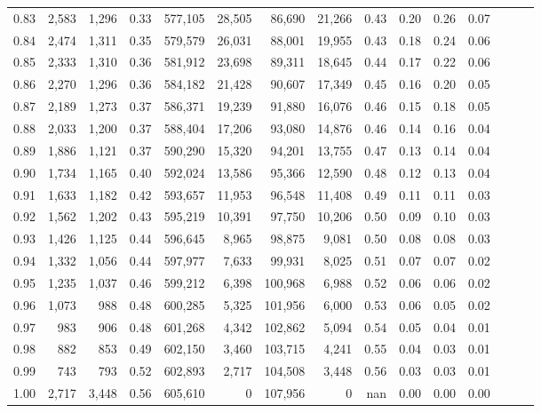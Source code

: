 \begin{tabular}{rrrrrrrrrrrrrrr}
0.83 &   2,583 &  1,296 &  0.33 &  577,105 &   28,505 &   86,690 &   21,266 &  0.43 &  0.20 &  0.26 &      0.07 \\
0.84 &   2,474 &  1,311 &  0.35 &  579,579 &   26,031 &   88,001 &   19,955 &  0.43 &  0.18 &  0.24 &      0.06 \\
0.85 &   2,333 &  1,310 &  0.36 &  581,912 &   23,698 &   89,311 &   18,645 &  0.44 &  0.17 &  0.22 &      0.06 \\
0.86 &   2,270 &  1,296 &  0.36 &  584,182 &   21,428 &   90,607 &   17,349 &  0.45 &  0.16 &  0.20 &      0.05 \\
0.87 &   2,189 &  1,273 &  0.37 &  586,371 &   19,239 &   91,880 &   16,076 &  0.46 &  0.15 &  0.18 &      0.05 \\
0.88 &   2,033 &  1,200 &  0.37 &  588,404 &   17,206 &   93,080 &   14,876 &  0.46 &  0.14 &  0.16 &      0.04 \\
0.89 &   1,886 &  1,121 &  0.37 &  590,290 &   15,320 &   94,201 &   13,755 &  0.47 &  0.13 &  0.14 &      0.04 \\
0.90 &   1,734 &  1,165 &  0.40 &  592,024 &   13,586 &   95,366 &   12,590 &  0.48 &  0.12 &  0.13 &      0.04 \\
0.91 &   1,633 &  1,182 &  0.42 &  593,657 &   11,953 &   96,548 &   11,408 &  0.49 &  0.11 &  0.11 &      0.03 \\
0.92 &   1,562 &  1,202 &  0.43 &  595,219 &   10,391 &   97,750 &   10,206 &  0.50 &  0.09 &  0.10 &      0.03 \\
0.93 &   1,426 &  1,125 &  0.44 &  596,645 &    8,965 &   98,875 &    9,081 &  0.50 &  0.08 &  0.08 &      0.03 \\
0.94 &   1,332 &  1,056 &  0.44 &  597,977 &    7,633 &   99,931 &    8,025 &  0.51 &  0.07 &  0.07 &      0.02 \\
0.95 &   1,235 &  1,037 &  0.46 &  599,212 &    6,398 &  100,968 &    6,988 &  0.52 &  0.06 &  0.06 &      0.02 \\
0.96 &   1,073 &    988 &  0.48 &  600,285 &    5,325 &  101,956 &    6,000 &  0.53 &  0.06 &  0.05 &      0.02 \\
0.97 &     983 &    906 &  0.48 &  601,268 &    4,342 &  102,862 &    5,094 &  0.54 &  0.05 &  0.04 &      0.01 \\
0.98 &     882 &    853 &  0.49 &  602,150 &    3,460 &  103,715 &    4,241 &  0.55 &  0.04 &  0.03 &      0.01 \\
0.99 &     743 &    793 &  0.52 &  602,893 &    2,717 &  104,508 &    3,448 &  0.56 &  0.03 &  0.03 &      0.01 \\
1.00 &   2,717 &  3,448 &  0.56 &  605,610 &        0 &  107,956 &        0 &   nan &  0.00 &  0.00 &      0.00 \\
\bottomrule
\end{tabular}
